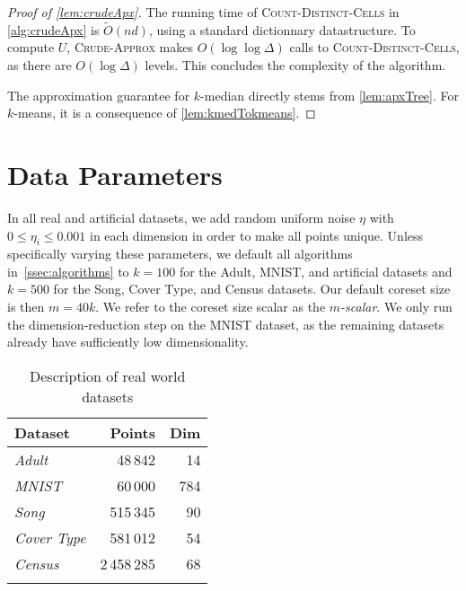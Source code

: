 \begin{proof}[Proof of \cref{lem:crudeApx}]
The running time of \textsc{Count-Distinct-Cells} in \cref{alg:crudeApx} is $\tilde O(nd)$, using a standard dictionnary datastructure. To compute $U$,
\textsc{Crude-Approx} makes $O(\log \log \Delta)$ calls to \textsc{Count-Distinct-Cells}, as there are $O(\log \Delta)$ levels. This concludes the complexity of
the algorithm.

The approximation guarantee for $k$-median directly stems from \cref{lem:apxTree}. For $k$-means, it is a consequence of \cref{lem:kmedTokmeans}.
\end{proof}



\section{Data Parameters}
\label{app:data_params}
In all real and artificial datasets, we add random uniform noise $\eta$ with $0 \leq \eta_i \leq 0.001$ in each dimension in order to make all points unique.
Unless specifically varying these parameters, we default all algorithms in~\ref{ssec:algorithms} to $k=100$ for the Adult, MNIST, and artificial datasets and
$k=500$ for the Song, Cover Type, and Census datasets. Our default coreset size is then $m = 40k$. We refer to the coreset size scalar as the \emph{$m$-scalar}.
We only run the dimension-reduction step on the MNIST dataset, as the remaining datasets already have sufficiently low dimensionality.

\begin{table}[htbp]
    \centering
    \begin{tabular}{lrr}
        Dataset & Points & Dim \\
        \hline
        \emph{Adult} & 48\,842 & 14 \\
        \emph{MNIST} & 60\,000 & 784 \\
        \emph{Song} & 515\,345 & 90 \\
        \emph{Cover Type} & 581\,012 & 54 \\
        \emph{Census} & 2\,458\,285 & 68 \\
        \hline
        \vspace*{0.1cm}
    \end{tabular}
    \caption{Description of real world datasets}
    \label{tbl:datasets}
\end{table}


